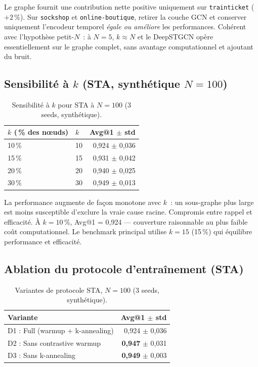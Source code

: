 \documentclass[a4paper,11pt,oneside]{report}
\begin{document}
Le graphe fournit une contribution nette positive uniquement sur \texttt{trainticket} ($+2\,\%$). Sur \texttt{sockshop} et \texttt{online-boutique}, retirer la couche GCN et conserver uniquement l'encodeur temporel \emph{\'egale ou am\'eliore} les performances. Coh\'erent avec l'hypoth\`ese petit-$N$~: \`a $N{=}5$, $k \approx N$ et le DeepSTGCN op\`ere essentiellement sur le graphe complet, sans avantage computationnel et ajoutant du bruit.

\subsection{Sensibilit\'e \`a $k$ (STA, synth\'etique $N{=}100$)}

\begin{table}[ht]
\centering
\caption{Sensibilit\'e \`a $k$ pour STA \`a $N{=}100$ (3 seeds, synth\'etique).}
\label{tab:ablation-k}
\begin{tabular}{llr}
\toprule
$k$ (\,\% des nœuds) & $k$ & Avg@1 $\pm$ std \\
\midrule
10\,\% & 10 & 0{,}924 $\pm$ 0{,}036 \\
15\,\% & 15 & 0{,}931 $\pm$ 0{,}042 \\
20\,\% & 20 & 0{,}940 $\pm$ 0{,}025 \\
30\,\% & 30 & 0{,}949 $\pm$ 0{,}013 \\
\bottomrule
\end{tabular}
\end{table}

La performance augmente de fa\c{c}on monotone avec $k$~: un sous-graphe plus large est moins susceptible d'exclure la vraie cause racine. Compromis entre rappel et efficacit\'e. \`A $k{=}10\,\%$, Avg@1 = 0{,}924 --- couverture raisonnable au plus faible co\^ut computationnel. Le benchmark principal utilise $k{=}15$ (15\,\%) qui \'equilibre performance et efficacit\'e.

\subsection{Ablation du protocole d'entra\^inement (STA)}

\begin{table}[ht]
\centering
\caption{Variantes de protocole STA, $N{=}100$ (3 seeds, synth\'etique).}
\label{tab:ablation-D}
\begin{tabular}{lr}
\toprule
Variante & Avg@1 $\pm$ std \\
\midrule
D1 : Full (warmup + k-annealing) & 0{,}924 $\pm$ 0{,}036 \\
D2 : Sans contrastive warmup & \textbf{0{,}947} $\pm$ 0{,}031 \\
D3 : Sans k-annealing & \textbf{0{,}949} $\pm$ 0{,}003 \\
\bottomrule
\end{tabular}
\end{table}
\end{document}
